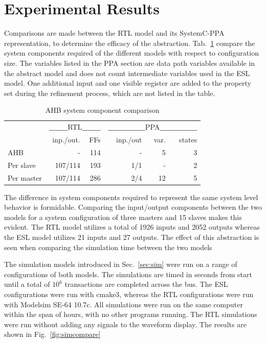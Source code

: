 \section{Experimental Results}
 
Comparisons are made between the RTL model and its SystemC-PPA representation, to determine the efficacy of the abstraction. Tab.~\ref{tab:stats} compare the system components required of the different models with respect to configuration size. The variables listed in the PPA section are data path variables available in the abstract model and does not count intermediate variables used in the ESL model. One additional input and one visible register are added to the property set during the refinement process, which are not listed in the table. 

\begin{table}[hbt] 
  \begin{tabular}{ l r r r r r}
  \hline 
  \hline
      & \multicolumn{2}{c}{\textbf{\_\_\_}RTL\textbf{\_\_\_}} & \multicolumn{3}{c}{\textbf{\_\_\_\_\_\_}PPA\textbf{\_\_\_\_\_\_}} \\
   & inp./out. & FFs & inp./out & var. & states \\
    \hline
  AHB & - & 114 & - & 5 & 3 \\
  
  Per slave & 107/114 & 193 & 1/1 & - & 2 \\
 
  Per master & 107/114 & 286 & 2/4 & 12 & 5 \\
    \hline
    \hline  
  \end{tabular}
\caption{AHB system component comparison}
\label{tab:stats}
\end{table}

The difference in system components required to represent the same system level behavior is formidable. Comparing the input/output components between the two models for a system configuration of three masters and 15 slaves makes this evident. The RTL model utilizes a total of 1926 inputs and 2052 outputs whereas the ESL model utilizes 21 inputs and 27 outputs. The effect of this abstraction is seen when comparing the simulation time between the two models \par 
The simulation models introduced in Sec.~\ref{sec:sim} were run on a range of configurations of both models. The simulations are timed in seconds from start until a total of $10^6$ transactions are completed across the bus. The ESL configurations were run with cmake3, whereas the RTL configurations were run with Modelsim SE-64 10.7c. All simulations were run on the same computer within the span of hours, with no other programs running. The RTL simulations were run without adding any signals to the waveform display. The results are shown in Fig.~\ref{fig:simcompare} 
\newpage 

